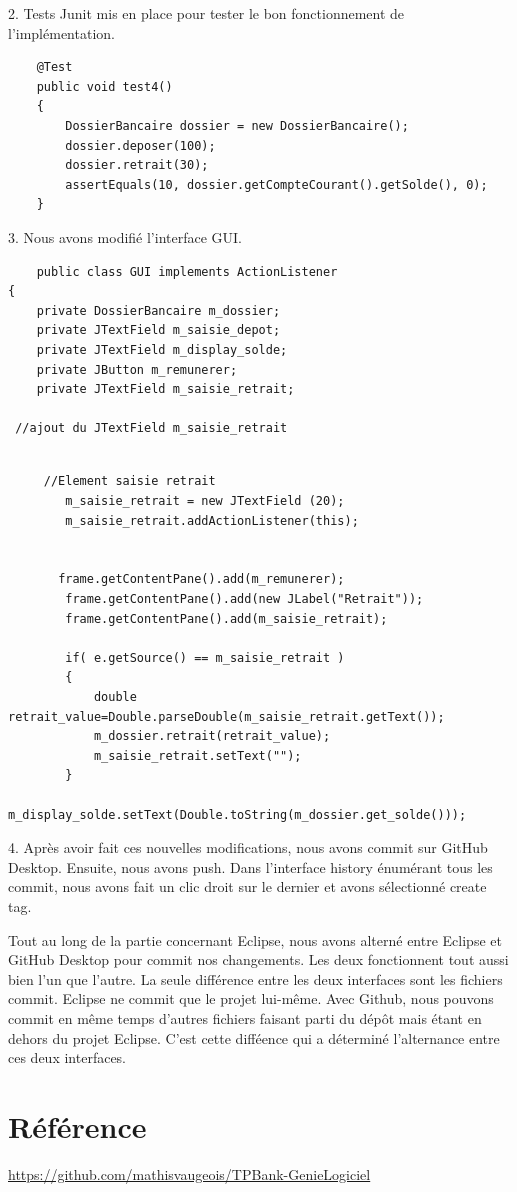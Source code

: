\documentclass{article}
\begin{document}
2.
Tests Junit mis en place pour tester le bon fonctionnement de l'implémentation.
\begin{lstlisting}
    @Test  
	public void test4()
	{
		DossierBancaire dossier = new DossierBancaire();
		dossier.deposer(100);
		dossier.retrait(30);
		assertEquals(10, dossier.getCompteCourant().getSolde(), 0);
	}
\end{lstlisting}

3.
Nous avons modifié l'interface GUI.

\begin{lstlisting}
    public class GUI implements ActionListener 
{
	private DossierBancaire m_dossier;
	private JTextField m_saisie_depot;
	private JTextField m_display_solde;
	private JButton m_remunerer;
	private JTextField m_saisie_retrait;

 //ajout du JTextField m_saisie_retrait
	
\end{lstlisting}
\begin{lstlisting}
     //Element saisie retrait
        m_saisie_retrait = new JTextField (20);
        m_saisie_retrait.addActionListener(this);


       frame.getContentPane().add(m_remunerer); 
        frame.getContentPane().add(new JLabel("Retrait"));
        frame.getContentPane().add(m_saisie_retrait);

        if( e.getSource() == m_saisie_retrait )
    	{
    		double retrait_value=Double.parseDouble(m_saisie_retrait.getText());
    		m_dossier.retrait(retrait_value);
    		m_saisie_retrait.setText("");
    	}
    	m_display_solde.setText(Double.toString(m_dossier.get_solde())); 
\end{lstlisting}

4. Après avoir fait ces nouvelles modifications, nous avons commit sur GitHub Desktop. Ensuite, nous avons push. Dans l'interface history énumérant tous les commit, nous avons fait un clic droit sur le dernier et avons sélectionné create tag.

Tout au long de la partie concernant Eclipse, nous avons alterné entre Eclipse et GitHub Desktop pour commit nos changements. Les deux fonctionnent tout aussi bien l'un que l'autre. La seule différence entre les deux interfaces sont les fichiers commit. Eclipse ne commit que le projet lui-même. Avec Github, nous pouvons commit en même temps d'autres fichiers faisant parti du dépôt mais étant en dehors du projet Eclipse. C'est cette difféence qui a déterminé l'alternance entre ces deux interfaces.
\section*{Référence}
\url{https://github.com/mathisvaugeois/TPBank-GenieLogiciel}
\end{document}
